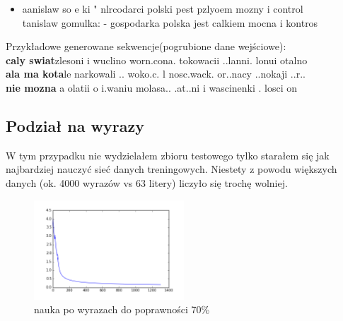 \documentclass[11pt,leqno]{article}
\begin{document}
\begin{multicols}{2}
\begin{itemize}
        \item   aanislaw so e ki  " nlrcodarci polski pest pzlyoem mozny i control \\
                tanislaw gomulka: - gospodarka polska jest calkiem mocna i kontros
    \end{itemize}
    Przykładowe generowane sekwencje(pogrubione dane wejściowe): \\
    \textbf{caly swiat}zlesoni i wuclino worn.cona.  tokowacii ..lanni. lonui otalno \\
    \textbf{ala ma kota}le narkowali .. woko.c.  l nosc.wack. or..nacy ..nokaji ..r.. \\
    \textbf{nie mozna }a olatii  o i.waniu molasa.. .at..ni i wascinenki . losci  on
\end{multicols}

\subsection{Podział na wyrazy}
W tym przypadku nie wydzielałem zbioru testowego tylko starałem się jak najbardziej nauczyć sieć danych treningowych. Niestety z powodu większych danych (ok. 4000 wyrazów vs 63 litery) liczyło się trochę wolniej.

\begin{figure}[!h]
    \includegraphics[width=0.5\textwidth]{pictures/word_progress.png}
    \caption{nauka po wyrazach do poprawności 70\%}
\end{figure}
\end{document}
